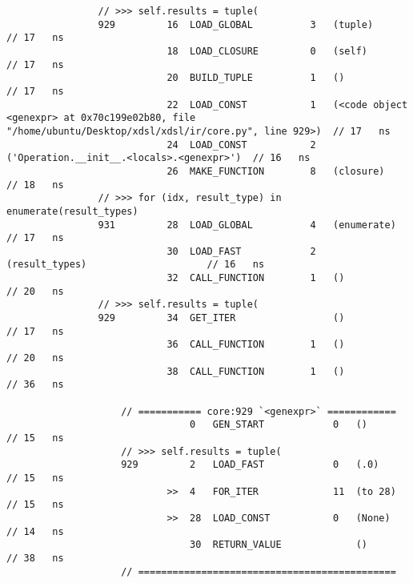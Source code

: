 \begin{code}
\begin{verbatim}
                // >>> self.results = tuple(
                929         16  LOAD_GLOBAL          3   (tuple)                            // 17   ns
                            18  LOAD_CLOSURE         0   (self)                             // 17   ns
                            20  BUILD_TUPLE          1   ()                                 // 17   ns
                            22  LOAD_CONST           1   (<code object <genexpr> at 0x70c199e02b80, file "/home/ubuntu/Desktop/xdsl/xdsl/ir/core.py", line 929>)  // 17   ns
                            24  LOAD_CONST           2   ('Operation.__init__.<locals>.<genexpr>')  // 16   ns
                            26  MAKE_FUNCTION        8   (closure)                          // 18   ns
                // >>> for (idx, result_type) in enumerate(result_types)
                931         28  LOAD_GLOBAL          4   (enumerate)                        // 17   ns
                            30  LOAD_FAST            2   (result_types)                     // 16   ns
                            32  CALL_FUNCTION        1   ()                                 // 20   ns
                // >>> self.results = tuple(
                929         34  GET_ITER                 ()                                 // 17   ns
                            36  CALL_FUNCTION        1   ()                                 // 20   ns
                            38  CALL_FUNCTION        1   ()                                 // 36   ns

                    // =========== core:929 `<genexpr>` ============
                                0   GEN_START            0   ()                             // 15   ns
                    // >>> self.results = tuple(
                    929         2   LOAD_FAST            0   (.0)                           // 15   ns
                            >>  4   FOR_ITER             11  (to 28)                        // 15   ns
                            >>  28  LOAD_CONST           0   (None)                         // 14   ns
                                30  RETURN_VALUE             ()                             // 38   ns
                    // =============================================


\end{verbatim}
\end{code}
